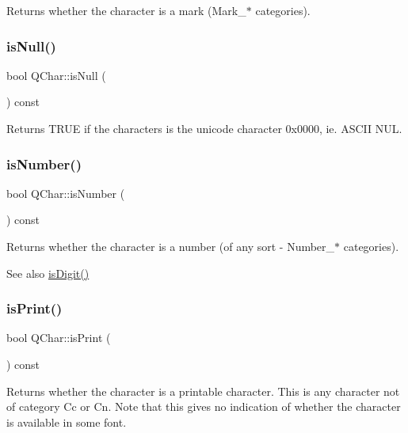 Returns whether the character is a mark (Mark\+\_\+$\ast$ categories). \mbox{\label{class_q_char_a580c84db3f1208df21a8427a01fc725c}} 
\subsubsection{\texorpdfstring{isNull()}{isNull()}}
{\footnotesize\ttfamily bool Q\+Char\+::is\+Null (\begin{DoxyParamCaption}{ }\end{DoxyParamCaption}) const\hspace{0.3cm}{\ttfamily [inline]}}

Returns T\+R\+UE if the characters is the unicode character 0x0000, ie. A\+S\+C\+II N\+UL. \mbox{\label{class_q_char_a95ea2bc6938379f1e108b44d61133d29}} 
\subsubsection{\texorpdfstring{isNumber()}{isNumber()}}
{\footnotesize\ttfamily bool Q\+Char\+::is\+Number (\begin{DoxyParamCaption}{ }\end{DoxyParamCaption}) const}

Returns whether the character is a number (of any sort -\/ Number\+\_\+$\ast$ categories).

\begin{DoxySeeAlso}{See also}
\mbox{\hyperlink{class_q_char_a5758b5318fe28041c0729dded5b1b44e}{is\+Digit()}} 
\end{DoxySeeAlso}
\mbox{\label{class_q_char_a569287b3f87942299de440ec40549d94}} 
\subsubsection{\texorpdfstring{isPrint()}{isPrint()}}
{\footnotesize\ttfamily bool Q\+Char\+::is\+Print (\begin{DoxyParamCaption}{ }\end{DoxyParamCaption}) const}

Returns whether the character is a printable character. This is any character not of category Cc or Cn. Note that this gives no indication of whether the character is available in some font. \mbox{\label{class_q_char_a1242013d955d60b26acbba3ed63d556f}} 

